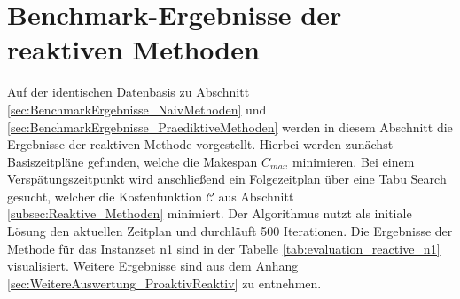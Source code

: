 \section{Benchmark-Ergebnisse der reaktiven Methoden} \label{sec:BenchmarkErgebnisse_ReaktiveMethoden}

Auf der identischen Datenbasis zu Abschnitt \ref{sec:BenchmarkErgebnisse_NaivMethoden} und \ref{sec:BenchmarkErgebnisse_PraediktiveMethoden} werden in diesem Abschnitt die Ergebnisse der reaktiven Methode vorgestellt. Hierbei werden zunächst Basiszeitpläne gefunden, welche die Makespan $C_{max}$ minimieren. Bei einem Verspätungszeitpunkt wird anschließend ein Folgezeitplan über eine Tabu Search gesucht, welcher die Kostenfunktion $\mathcal{C}$ aus Abschnitt \ref{subsec:Reaktive_Methoden} minimiert. Der Algorithmus nutzt als initiale Lösung den aktuellen Zeitplan und durchläuft 500 Iterationen. Die Ergebnisse der Methode für das Instanzset n1 sind in der Tabelle \ref{tab:evaluation_reactive_n1} visualisiert. Weitere Ergebnisse sind aus dem Anhang \ref{sec:WeitereAuswertung_ProaktivReaktiv} zu entnehmen. 

